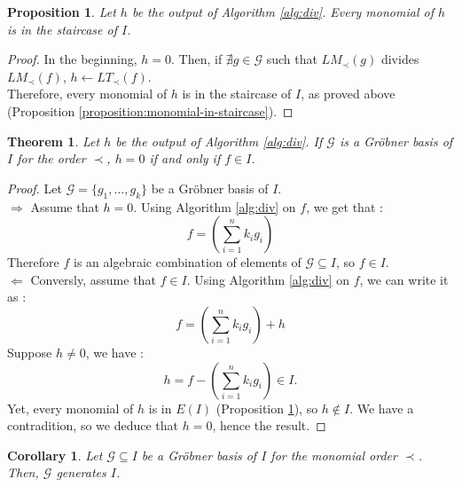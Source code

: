\documentclass{article}
\newtheorem{theorem}{Theorem}[section]
\newtheorem{corollary}{Corollary}[theorem]
\newtheorem{proposition}{Proposition}[section]
\begin{document}
\begin{proposition} \label{proposition:monomials-h-staircase}
    Let $h$ be the output of Algorithm \ref{alg:div}. Every monomial of $h$ is in the staircase of $I$.
\end{proposition}
    
\begin{proof}
    In the beginning, $h = 0$. Then, if $\nexists g \in \mathscr{G}$ such that $LM_{\prec}(g)$ divides $LM_{\prec}(f)$, $h \gets LT_{\prec}(f)$. \\
    Therefore, every monomial of $h$ is in the staircase of $I$, as proved above (Proposition \ref{proposition:monomial-in-staircase}). 
\end{proof}

\begin{theorem} \label{th:ideal-membership-test}
    Let $h$ be the output of Algorithm \ref{alg:div}. If $\mathscr{G}$ is a Gröbner basis of $I$ for the order $\prec$, $h = 0$ if and only if $f \in I$.
\end{theorem}

\begin{proof}
    Let $\mathscr{G} = \{g_{1}, \dots, g_{k}\}$ be a Gröbner basis of $I$. \\
    $\Rightarrow$ Assume that $h = 0$. Using Algorithm \ref{alg:div} on $f$, we get that : 
    \begin{displaymath}
        f = \left( \sum_{i = 1}^{n} k_{i}g_{i} \right)
    \end{displaymath}
    Therefore $f$ is an algebraic combination of elements of $\mathscr{G} \subseteq I$, so $f \in I$. \\
    $\Leftarrow$ Conversly, assume that $f \in I$. Using Algorithm \ref{alg:div} on $f$, we can write it as :
    \begin{displaymath}
        f = \left( \sum_{i = 1}^{n} k_{i}g_{i} \right) + h
    \end{displaymath}
    Suppose $h \neq 0$, we have : 
    \begin{displaymath}
        h = f - \left( \sum_{i = 1}^{n} k_{i}g_{i} \right) \in I. 
    \end{displaymath}
    Yet, every monomial of $h$ is in $E(I)$ (Proposition \ref{proposition:monomials-h-staircase}), so $h \notin I$. We have a contradition, so we deduce that $h = 0$, hence the result.
\end{proof}

\begin{corollary} \label{corollary:g-generates-i}
    Let $\mathscr{G} \subseteq I$ be a Gröbner basis of $I$ for the monomial order $\prec$. Then, $\mathscr{G}$ generates $I$.
\end{corollary}
\end{document}
